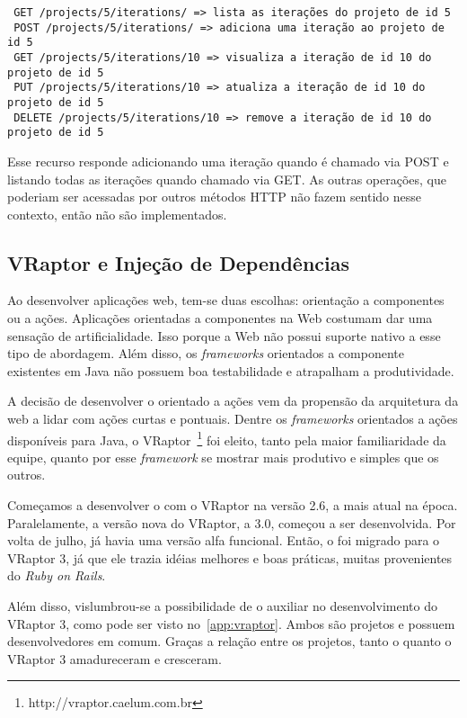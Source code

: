 \begin{verbatim}
 GET /projects/5/iterations/ => lista as iterações do projeto de id 5
 POST /projects/5/iterations/ => adiciona uma iteração ao projeto de id 5
 GET /projects/5/iterations/10 => visualiza a iteração de id 10 do projeto de id 5
 PUT /projects/5/iterations/10 => atualiza a iteração de id 10 do projeto de id 5
 DELETE /projects/5/iterations/10 => remove a iteração de id 10 do projeto de id 5
\end{verbatim}

Esse recurso responde adicionando uma iteração quando é chamado via POST e listando todas as iterações quando chamado via GET. As outras operações, que poderiam ser acessadas por outros métodos HTTP não fazem sentido nesse contexto, então não são implementados.

\subsection{VRaptor e Injeção de Dependências}

Ao desenvolver aplicações web, tem-se duas escolhas: orientação a componentes ou a ações. Aplicações orientadas a componentes na Web costumam dar uma sensação de artificialidade. Isso porque a Web não possui suporte nativo a esse tipo de abordagem. Além disso, os \textit{frameworks} orientados a componente existentes em Java não possuem boa testabilidade e atrapalham a produtividade. 

A decisão de desenvolver o \calopsita{} orientado a ações vem da propensão da arquitetura da web a lidar com ações curtas e pontuais. Dentre os \textit{frameworks} orientados a ações disponíveis para Java, o VRaptor~\footnote{http://vraptor.caelum.com.br} foi eleito, tanto pela maior familiaridade da equipe, quanto por esse \textit{framework} se mostrar mais produtivo e simples que os outros.

Começamos a desenvolver o \calopsita{} com o VRaptor na versão 2.6, a mais atual na época. Paralelamente, a versão nova do VRaptor, a 3.0, começou a ser desenvolvida. Por volta de julho, já havia uma versão alfa funcional. Então, o \calopsita{} foi migrado para o VRaptor 3, já que ele trazia idéias melhores e boas práticas, muitas provenientes do \textit{Ruby on Rails}. 

Além disso, vislumbrou-se a possibilidade de o \calopsita{} auxiliar no desenvolvimento do VRaptor 3, como pode ser visto no~\ref{app:vraptor}. Ambos são projetos \opensource{} e possuem desenvolvedores em comum. Graças a relação entre os projetos, tanto o \calopsita{} quanto o VRaptor 3 amadureceram e cresceram.

